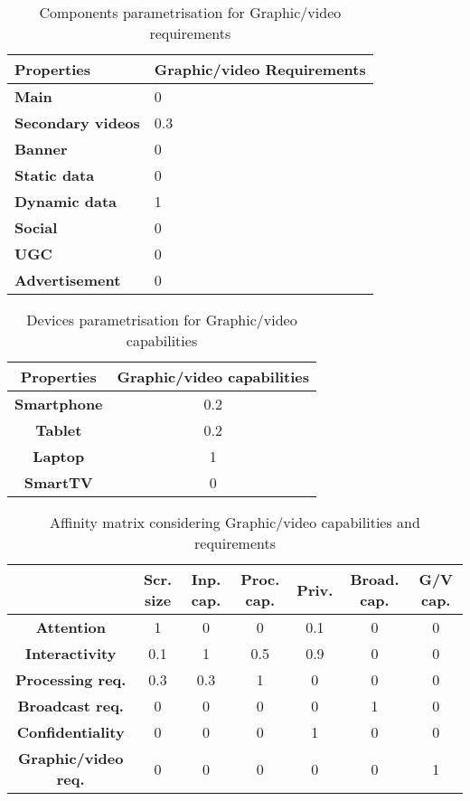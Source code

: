 \begin{table}
	\centering
	\caption {Components parametrisation for Graphic/video requirements} \label{tab:compgv}
	\begin{tabular}{||M{10em}|M{6cm}||}
		
		\hline \textbf{Properties} & \textbf{Graphic/video Requirements} \\
		\hline \textbf{Main} & 0 \\
		\hline \textbf{Secondary videos} & 0.3 \\
		\hline \textbf{Banner} & 0 \\
		\hline \textbf{Static data} & 0 \\
		\hline \textbf{Dynamic data} & 1 \\
		\hline \textbf{Social} & 0 \\
		\hline \textbf{UGC} & 0 \\
		\hline \textbf{Advertisement} & 0 \\
		\hline
		
	\end{tabular}
\end{table}


\begin{table}
	\centering
	\caption {Devices parametrisation for Graphic/video capabilities} \label{tab:devgv}
	\begin{tabular}{||c|c||}
		
		\hline
		\textbf{Properties} & \textbf{Graphic/video capabilities} \\
		\hline
		\textbf{Smartphone} & 0.2 \\
		\hline
		\textbf{Tablet} & 0.2 \\
		\hline
		\textbf{Laptop} & 1 \\
		\hline 
		\textbf{SmartTV} & 0 \\
		\hline
	\end{tabular}
\end{table}


\begin{table*}
	\centering
	\caption {Affinity matrix considering Graphic/video capabilities and requirements}\label{tab:affgv}
	\begin{tabular}{||c|c|c|c|c|c|c||}
		\hline
		\textbf{} & \textbf{Scr. size} & \textbf{Inp. cap.} & \textbf{Proc. cap.} & \textbf{Priv.} & \textbf{Broad. cap.} & \textbf{G/V cap.}\\
		\hline
		\textbf{Attention} & 1 & 0 & 0 & 0.1 & 0 & 0\\
		\hline
		\textbf{Interactivity} & 0.1 & 1 & 0.5 & 0.9 & 0 & 0\\
		\hline
		\textbf{Processing req.} & 0.3 & 0.3 & 1 & 0 & 0 & 0  \\
		\hline
		\textbf{Broadcast req.} & 0 & 0 & 0 & 0 & 1 & 0 \\
		\hline 
		\textbf{Confidentiality} & 0 & 0 & 0 & 1 & 0 & 0\\
		\hline
		\textbf{Graphic/video req.} & 0 & 0 & 0 & 0 & 0 & 1 \\
		\hline
	\end{tabular}
\end{table*}

